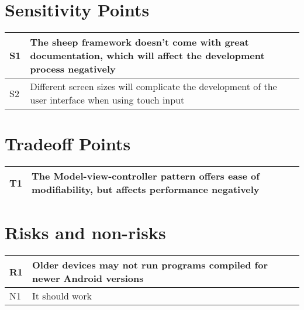 \section{Sensitivity Points}
\begin{tabular}{|m{}|m{}|}
  \hline
  S1 & The sheep framework doesn't come with great documentation, which will affect the development process negatively \\ \hline
  S2 & Different screen sizes will complicate the development of the user interface when using touch input \\ \hline
\end{tabular}

\section{Tradeoff Points}
\begin{tabular}{|m{}|m{}|}
  \hline
  T1 & The Model-view-controller pattern offers ease of modifiability, but affects performance negatively \\ \hline
\end{tabular}

\section{Risks and non-risks}
\begin{tabular}{|m{}|m{}|}
  \hline
  R1 & Older devices may not run programs compiled for newer Android versions \\ \hline
  N1 & It should work \\ \hline
\end{tabular}
